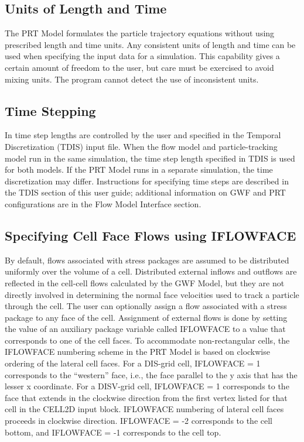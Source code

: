 \subsection{Units of Length and Time}
The PRT Model formulates the particle trajectory equations without using prescribed length and time units. Any consistent units of length and time can be used when specifying the input data for a simulation. This capability gives a certain amount of freedom to the user, but care must be exercised to avoid mixing units.  The program cannot detect the use of inconsistent units.

\subsection{Time Stepping}
In \mf time step lengths are controlled by the user and specified in the Temporal Discretization (TDIS) input file.  When the flow model and particle-tracking model run in the same simulation, the time step length specified in TDIS is used for both models.  If the PRT Model runs in a separate simulation, the time discretization may differ.  Instructions for specifying time steps are described in the TDIS section of this user guide; additional information on GWF and PRT configurations are in the Flow Model Interface section.  

\subsection{Specifying Cell Face Flows using IFLOWFACE}

By default, flows associated with stress packages are assumed to be distributed uniformly over the volume of a cell. Distributed external inflows and outflows are reflected in the cell-cell flows calculated by the GWF Model, but they are not directly involved in determining the normal face velocities used to track a particle through the cell. The user can optionally assign a flow associated with a stress package to any face of the cell. Assignment of external flows is done by setting the value of an auxiliary package variable called IFLOWFACE to a value that corresponds to one of the cell faces. To accommodate non-rectangular cells, the IFLOWFACE numbering scheme in the PRT Model is based on clockwise ordering of the lateral cell faces. For a DIS-grid cell, IFLOWFACE = 1 corresponds to the ``western'' face, i.e., the face parallel to the y axis that has the lesser x coordinate. For a DISV-grid cell, IFLOWFACE = 1 corresponds to the face that extends in the clockwise direction from the first vertex listed for that cell in the CELL2D input block. IFLOWFACE numbering of lateral cell faces proceeds in clockwise direction. IFLOWFACE = -2 corresponds to the cell bottom, and IFLOWFACE = -1 corresponds to the cell top.

